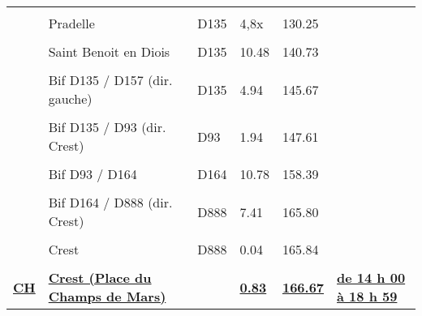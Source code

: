 \documentclass{article}%
\begin{document}
\begin{longtable}{p{2.25cm}|p{6.7cm}|p{2.0cm}|p{1.5cm}|p{1.5cm}|p{3.5cm}}
 & & & & & \\%
 &Pradelle&D135&4,8x&130.25& \\%
 & & & & & \\%
 &Saint Benoit en Diois&D135&10.48&140.73& \\%
 & & & & & \\%
 &Bif D135 / D157 (dir. gauche)&D135&4.94&145.67& \\%
 & & & & & \\%
 &Bif D135 / D93 (dir. Crest)&D93&1.94&147.61& \\%
 & & & & & \\%
 &Bif D93 / D164&D164&10.78&158.39& \\%
 & & & & & \\%
 &Bif D164 / D888 (dir. Crest)&D888&7.41&165.80& \\%
 & & & & & \\%
 &Crest &D888&0.04&165.84& \\%
 & & & & & \\%
\textbf{\underline{CH}}&\textbf{\underline{Crest (Place du Champs de Mars)}}& &\textbf{\underline{0.83}}&\textbf{\underline{166.67}}&\textbf{\underline{de 14 h 00 à 18 h 59}}\\%
\hline%
\end{longtable}%
\end{document}
